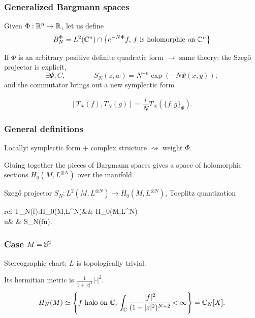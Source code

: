 \documentclass[mathserif]{beamer}
\begin{document}
\begin{frame}
 \frametitle{Generalized Bargmann spaces}
 Given $\Phi:\R^n\to \R$, let us define
    \[
     B_N^{\Phi}=L^2(\C^n)\cap\left\{e^{-N\Phi}f,\,f\text{ is
  holomorphic on $\C^n$}\right\}
    \]
    \vfill
    
    If $\Phi$ is an arbitrary positive definite quadratic form $\rightarrow$ same theory: 
    the Szeg\H{o} projector is explicit,
    \[
     \exists \Psi,C, \qquad \qquad S_N(z,w)=N^{-n}\exp(-N\Psi(x,y));
    \]
    and the commutator brings out a new symplectic form

    \[
     [T_N(f),T_N(g)]=\frac{i}{N}T_N(\{f,g\}_\Phi).
    \]
\end{frame}

\begin{frame}
 \frametitle{General definitions}
    Locally: symplectic form $+$ complex structure $\rightsquigarrow$ weight $\Phi$.
    
    \vfill
    
    Gluing together the pieces of Bargmann spaces gives a {\color{myorange} space of holomorphic sections} $H_0(M,L^{\otimes N})$ over the manifold.
    
    \vfill
    
    Szeg\H{o} projector $S_N:L^2(M,L^{\otimes N})\to H_0(M,L^{\otimes N})$, Toeplitz quantization
    \begin{center}
\begin{array}{rcl}
 		T_N(f):H_0(M,L^{\otimes N})&\to & H_0(M,L^{\otimes N})\\
		u& \mapsto& S_N(fu).
 		\end{array}
\end{center}
\end{frame}

\begin{frame}
  \frametitle{Case $M=\S^2$}
  Stereographic chart: $L$ is topologically trivial.

  \hspace{9.5em}Its hermitian metric is
  $\frac{1}{1+|z|^2}|\cdot|^2.$ \[H_N(M)\simeq \left\{f\text{ holo on $
        \C$},\,\int_{\C}\cfrac{|f|^2}{(1+|z|^2)^{N+2}}<\infty\right\}=\C_N[X].\]
\end{frame}
\end{document}
